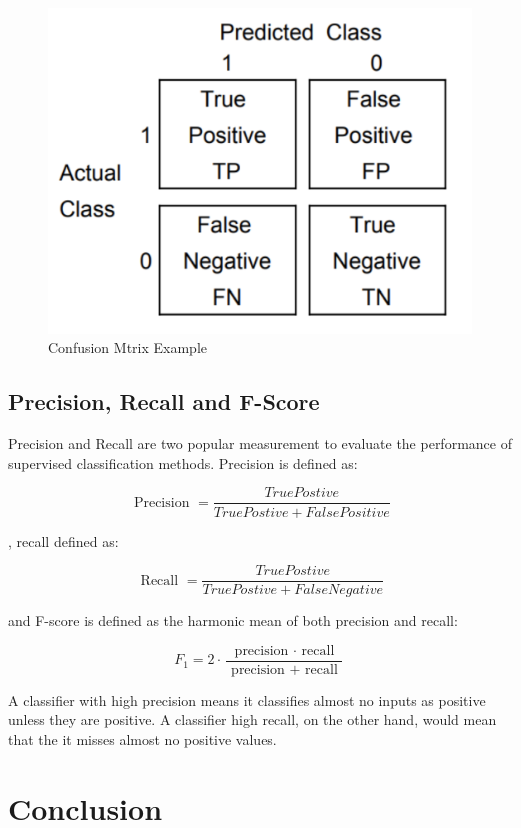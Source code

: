 \begin{figure}[hbtp]
\caption{Confusion Mtrix Example}
\includegraphics[scale=.5]{../Figures/Confuse_Mat_Example.png}\centering
\end{figure}

\subsection{Precision, Recall and F-Score}

Precision and Recall are two popular measurement to evaluate the performance of supervised classification methods. Precision is defined as:

$$\text { Precision } = \frac { True Postive } { True Postive + False Positive }$$

, recall defined as:

$$\text { Recall } = \frac { True Postive } { True Postive + False Negative }$$

and F-score is defined as the harmonic mean of both precision and recall:

$$F _ { 1 } = 2 \cdot \frac { \text { precision } \cdot \text { recall } } { \text { precision } + \text { recall } }$$

A classifier with high precision means it classifies almost no inputs as positive unless they are positive. A classifier high recall, on the other hand, would mean that the it misses almost no positive values. 
\section{Conclusion}

